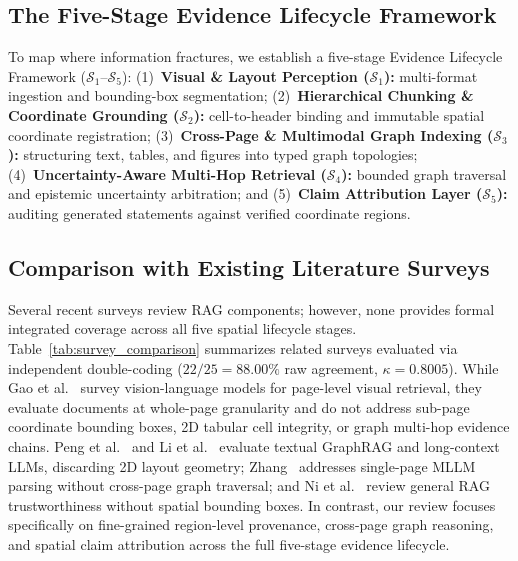 \documentclass[conference,a4paper]{IEEEtran}
\begin{document}
\subsection{The Five-Stage Evidence Lifecycle Framework}
To map where information fractures, we establish a five-stage Evidence Lifecycle Framework ($\mathcal{S}_1$--$\mathcal{S}_5$): (1)~\textbf{Visual \& Layout Perception ($\mathcal{S}_1$):} multi-format ingestion and bounding-box segmentation; (2)~\textbf{Hierarchical Chunking \& Coordinate Grounding ($\mathcal{S}_2$):} cell-to-header binding and immutable spatial coordinate registration; (3)~\textbf{Cross-Page \& Multimodal Graph Indexing ($\mathcal{S}_3$):} structuring text, tables, and figures into typed graph topologies; (4)~\textbf{Uncertainty-Aware Multi-Hop Retrieval ($\mathcal{S}_4$):} bounded graph traversal and epistemic uncertainty arbitration; and (5)~\textbf{Claim Attribution Layer ($\mathcal{S}_5$):} auditing generated statements against verified coordinate regions.

\subsection{Comparison with Existing Literature Surveys}
Several recent surveys review RAG components; however, none provides formal integrated coverage across all five spatial lifecycle stages. Table~\ref{tab:survey_comparison} summarizes related surveys evaluated via independent double-coding ($22/25 = 88.00\%$ raw agreement, $\kappa = 0.8005$). While Gao et al.~\cite{gao2026} survey vision-language models for page-level visual retrieval, they evaluate documents at whole-page granularity and do not address sub-page coordinate bounding boxes, 2D tabular cell integrity, or graph multi-hop evidence chains. Peng et al.~\cite{peng2025} and Li et al.~\cite{li2025} evaluate textual GraphRAG and long-context LLMs, discarding 2D layout geometry; Zhang~\cite{zhang2025} addresses single-page MLLM parsing without cross-page graph traversal; and Ni et al.~\cite{ni2026trustworthy} review general RAG trustworthiness without spatial bounding boxes. In contrast, our review focuses specifically on fine-grained region-level provenance, cross-page graph reasoning, and spatial claim attribution across the full five-stage evidence lifecycle.
\end{document}
